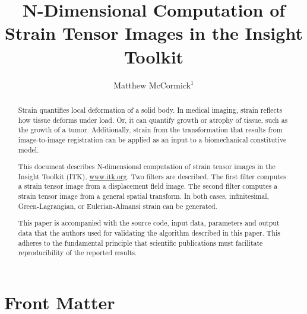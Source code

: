 \documentclass{InsightArticle}
\title{N-Dimensional Computation of Strain Tensor Images in the Insight Toolkit}
\author{Matthew McCormick$^{1}$}
\newcommand{\IJhandlerIDnumber}{3573}
\begin{document}
%
%
\IJhandlefooter{\IJhandlerIDnumber}


\ifpdf
\else
\fi


\maketitle


\ifhtml
\chapter*{Front Matter\label{front}}
\fi


\begin{abstract}
\noindent
Strain quantifies local deformation of a solid body. In medical imaging,
strain reflects how tissue deforms under load. Or, it can quantify growth or
atrophy of tissue, such as the growth of a tumor. Additionally, strain from the
transformation that results from image-to-image registration can be applied as
an input to a biomechanical constitutive model.

This document describes N-dimensional computation of strain tensor images in
the Insight Toolkit (ITK), \url{www.itk.org}. Two filters are described. The
first filter computes a strain tensor image from a displacement field image.
The second filter computes a strain tensor image from a general spatial
transform. In both cases, infinitesimal, Green-Lagrangian, or Eulerian-Almansi
strain can be generated.

This paper is accompanied with the source code, input data, parameters and
output data that the authors used for validating the algorithm described in
this paper. This adheres to the fundamental principle that scientific
publications must facilitate reproducibility of the reported results.

\end{abstract}
\end{document}
